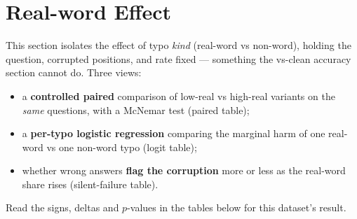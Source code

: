 \documentclass[11pt]{article}
\begin{document}




\section*{Real-word Effect}
\noindent This section isolates the effect of typo \emph{kind}
(real-word vs non-word), holding the question, corrupted positions, and rate fixed ---
something the vs-clean accuracy section cannot do. Three views:
\begin{itemize}\setlength{\itemsep}{1pt}
  \item a \textbf{controlled paired} comparison of low-real vs high-real variants on
  the \emph{same} questions, with a McNemar test (paired table);
  \item a \textbf{per-typo logistic regression} comparing the marginal harm of one
  real-word vs one non-word typo (logit table);
  \item whether wrong answers \textbf{flag the corruption} more or less as the
  real-word share rises (silent-failure table).
\end{itemize}
\noindent Read the signs, deltas and $p$-values in the tables below for this
dataset's result.
\medskip
\end{document}
